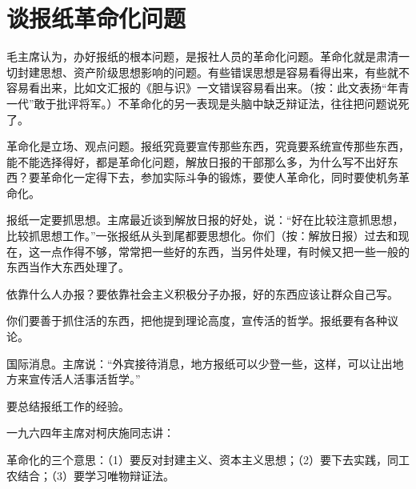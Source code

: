 \section[谈报纸革命化问题（一九六四年一月）]{谈报纸革命化问题}


毛主席认为，办好报纸的根本问题，是报社人员的革命化问题。革命化就是肃清一切封建思想、资产阶级思想影响的问题。有些错误思想是容易看得出来，有些就不容易看出来，比如文汇报的《胆与识》一文错误容易看出来。（按：此文表扬“年青一代”敢于批评将军。）不革命化的另一表现是头脑中缺乏辩证法，往往把问题说死了。

革命化是立场、观点问题。报纸究竟要宣传那些东西，究竟要系统宣传那些东西，能不能选择得好，都是革命化问题，解放日报的干部那么多，为什么写不出好东西？要革命化一定得下去，参加实际斗争的锻炼，要使人革命化，同时要使机务革命化。

报纸一定要抓思想。主席最近谈到解放日报的好处，说：“好在比较注意抓思想，比较抓思想工作。”一张报纸从头到尾都要思想化。你们（按：解放日报）过去和现在，这一点作得不够，常常把一些好的东西，当另件处理，有时候又把一些一般的东西当作大东西处理了。

依靠什么人办报？要依靠社会主义积极分子办报，好的东西应该让群众自己写。

你们要善于抓住活的东西，把他提到理论高度，宣传活的哲学。报纸要有各种议论。

国际消息。主席说：“外宾接待消息，地方报纸可以少登一些，这样，可以让出地方来宣传活人活事活哲学。”

要总结报纸工作的经验。

一九六四年主席对柯庆施同志讲：

革命化的三个意思：（1）要反对封建主义、资本主义思想；（2）要下去实践，同工农结合；（3）要学习唯物辩证法。


